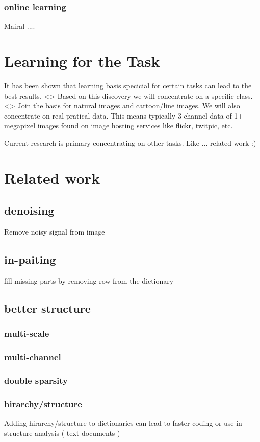 \subsubsection{online learning}
Mairal .... \cite{Mairal2010}

\section{Learning for the Task}
It has been shown that learning basis specicial for certain tasks can lead to the best results\cite{}.  <>
Based on this discovery we will concentrate on a specific class. <> Join the basis for natural images and cartoon/line images.
We will also concentrate on real pratical data. This means typically 3-channel data of 1+ megapixel images found on image hosting services like flickr, twitpic, etc.

Current research is primary concentrating on other tasks. 
Like ... related work :)

\section{Related work}
\subsection{denoising}
Remove noisy signal from image
\subsection{in-paiting}
fill missing parts by removing row from the dictionary
\subsection{better structure}
\subsubsection{multi-scale}
\subsubsection{multi-channel}
\subsubsection{double sparsity}
\subsubsection{hirarchy/structure}
Adding hirarchy/structure to dictionaries can lead to faster coding or use in structure analysis ( text documents )
\cite{Jenatton2010}

